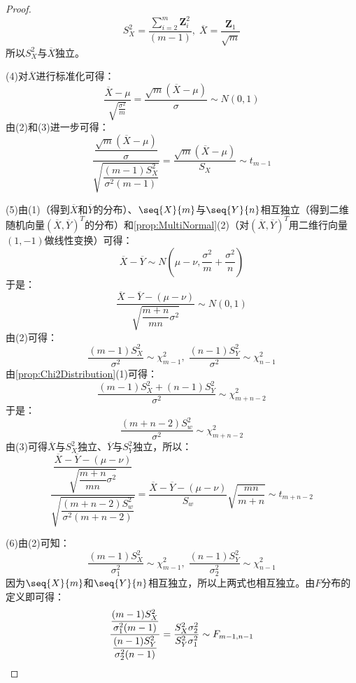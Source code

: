 \begin{proof}
\begin{equation*}
		S_X^2=\frac{\sum\limits_{i=2}^{m}\mathbf{Z}_i^2}{(m-1)},\;\overline{X}=\frac{\mathbf{Z}_1}{\sqrt{m}}
	\end{equation*}
	所以$S_X^2$与$\overline{X}$独立。\par
	(4)对$\overline{X}$进行标准化可得：
	\begin{equation*}
		\frac{\overline{X}-\mu}{\sqrt{\frac{\sigma^2}{m}}}=\frac{\sqrt{m}(\overline{X}-\mu)}{\sigma}\sim N(0,1)
	\end{equation*}
	由(2)和(3)进一步可得：
	\begin{equation*}
		\frac{\dfrac{\sqrt{m}(\overline{X}-\mu)}{\sigma}}{\sqrt{\dfrac{(m-1)S_X^2}{\sigma^2(m-1)}}}=\frac{\sqrt{m}(\overline{X}-\mu)}{S_X}\sim t_{m-1}
	\end{equation*}\par
	(5)由(1)（得到$\overline{X}$和$\overline{Y}$的分布）、$\seq{X}{m}$与$\seq{Y}{n}$相互独立（得到二维随机向量$(\overline{X},\overline{Y})^T$的分布）和\cref{prop:MultiNormal}(2)（对$(\overline{X},\overline{Y})^T$用二维行向量$(1,-1)$做线性变换）可得：
	\begin{equation*}
		\overline{X}-\overline{Y}\sim N\left(\mu-\nu,\frac{\sigma^2}{m}+\frac{\sigma^2}{n}\right)
	\end{equation*}
	于是：
	\begin{equation*}
		\frac{\overline{X}-\overline{Y}-(\mu-\nu)}{\sqrt{\dfrac{m+n}{mn}\sigma^2}}\sim N(0,1)
	\end{equation*}
	由(2)可得：
	\begin{equation*}
		\frac{(m-1)S_X^2}{\sigma^2}\sim\chi_{m-1}^2,\;
		\frac{(n-1)S_Y^2}{\sigma^2}\sim\chi_{n-1}^2
	\end{equation*}
	由\cref{prop:Chi2Distribution}(1)可得：
	\begin{equation*}
		\frac{(m-1)S_X^2+(n-1)S_Y^2}{\sigma^2}\sim\chi_{m+n-2}^2
	\end{equation*}
	于是：
	\begin{equation*}
		\frac{(m+n-2)S_w^2}{\sigma^2}\sim\chi_{m+n-2}^2
	\end{equation*}
	由(3)可得$\overline{X}$与$S_X^2$独立、$\overline{Y}$与$S_Y^2$独立，所以：
	\begin{equation*}
		\frac{\dfrac{\overline{X}-\overline{Y}-(\mu-\nu)}{\sqrt{\dfrac{m+n}{mn}\sigma^2}}}{\sqrt{\dfrac{(m+n-2)S_w^2}{\sigma^2(m+n-2)}}}=\frac{\overline{X}-\overline{Y}-(\mu-\nu)}{S_w}\sqrt{\dfrac{mn}{m+n}}\sim t_{m+n-2}
	\end{equation*}\par
	(6)由(2)可知：
	\begin{equation*}
		\frac{(m-1)S_X^2}{\sigma_1^2}\sim\chi_{m-1}^2,\;
		\frac{(n-1)S_Y^2}{\sigma_2^2}\sim\chi_{n-1}^2
	\end{equation*}
	因为$\seq{X}{m}$和$\seq{Y}{n}$相互独立，所以上两式也相互独立。由$F$分布的定义即可得：
	\begin{equation*}
		\frac{\dfrac{(m-1)S_X^2}{\sigma_1^2(m-1)}}{\dfrac{(n-1)S_Y^2}{\sigma_2^2(n-1)}}=\frac{S_X^2\sigma_2^2}{S_Y^2\sigma_1^2}\sim F_{m-1,n-1}\qedhere
	\end{equation*}
\end{proof}

